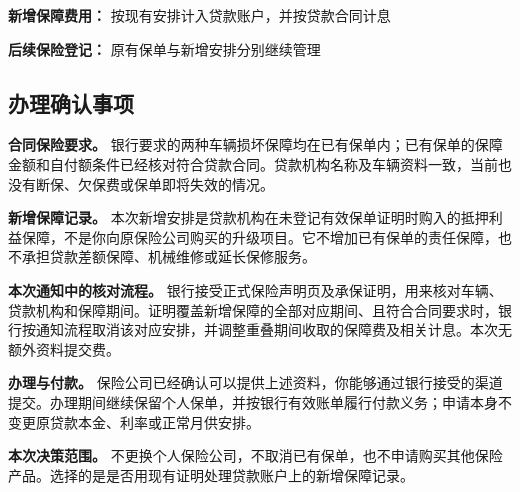 \documentclass[UTF8,fontset=none,11pt,a4paper]{ctexart}
\begin{document}
\textbf{新增保障费用：} 按现有安排计入贷款账户，并按贷款合同计息


\textbf{后续保险登记：} 原有保单与新增安排分别继续管理


\subsection*{办理确认事项}
\textbf{合同保险要求。} 银行要求的两种车辆损坏保障均在已有保单内；已有保单的保障金额和自付额条件已经核对符合贷款合同。贷款机构名称及车辆资料一致，当前也没有断保、欠保费或保单即将失效的情况。


\textbf{新增保障记录。} 本次新增安排是贷款机构在未登记有效保单证明时购入的抵押利益保障，不是你向原保险公司购买的升级项目。它不增加已有保单的责任保障，也不承担贷款差额保障、机械维修或延长保修服务。


\textbf{本次通知中的核对流程。} 银行接受正式保险声明页及承保证明，用来核对车辆、贷款机构和保障期间。证明覆盖新增保障的全部对应期间、且符合合同要求时，银行按通知流程取消该对应安排，并调整重叠期间收取的保障费及相关计息。本次无额外资料提交费。


\textbf{办理与付款。} 保险公司已经确认可以提供上述资料，你能够通过银行接受的渠道提交。办理期间继续保留个人保单，并按银行有效账单履行付款义务；申请本身不变更原贷款本金、利率或正常月供安排。


\textbf{本次决策范围。} 不更换个人保险公司，不取消已有保单，也不申请购买其他保险产品。选择的是是否用现有证明处理贷款账户上的新增保障记录。
\end{document}
